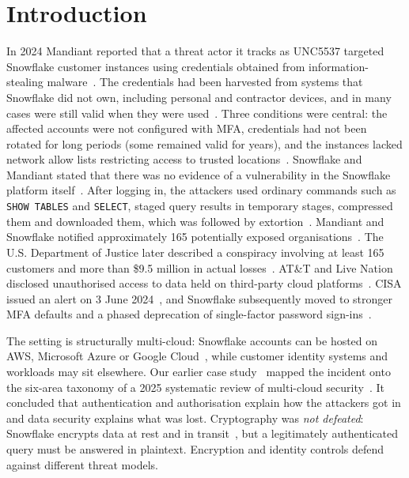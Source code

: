 \documentclass[conference]{IEEEtran}
\newcommand{\code}[1]{\texttt{\small #1}}
\begin{document}
\section{Introduction}
In 2024 Mandiant reported that a threat actor it tracks as UNC5537 targeted Snowflake customer instances using credentials obtained from information-stealing malware~\cite{mandiant2024unc5537}. The credentials had been harvested from systems that Snowflake did not own, including personal and contractor devices, and in many cases were still valid when they were used~\cite{casestudy2026}. Three conditions were central: the affected accounts were not configured with MFA, credentials had not been rotated for long periods (some remained valid for years), and the instances lacked network allow lists restricting access to trusted locations~\cite{mandiant2024unc5537}. Snowflake and Mandiant stated that there was no evidence of a vulnerability in the Snowflake platform itself~\cite{mandiant2024unc5537,snowflake-advisory2024}. After logging in, the attackers used ordinary commands such as \code{SHOW TABLES} and \code{SELECT}, staged query results in temporary stages, compressed them and downloaded them, which was followed by extortion~\cite{mandiant2024unc5537,casestudy2026}. Mandiant and Snowflake notified approximately 165 potentially exposed organisations~\cite{mandiant2024unc5537}. The U.S. Department of Justice later described a conspiracy involving at least 165 customers and more than \$9.5 million in actual losses~\cite{doj2026}. AT\&T and Live Nation disclosed unauthorised access to data held on third-party cloud platforms~\cite{att8k2024,livenation8k2024}. CISA issued an alert on 3 June 2024~\cite{cisa2024}, and Snowflake subsequently moved to stronger MFA defaults and a phased deprecation of single-factor password sign-ins~\cite{snowflake-mfa-rollout,kapko2024}.

The setting is structurally multi-cloud: Snowflake accounts can be hosted on AWS, Microsoft Azure or Google Cloud~\cite{snowflake-platforms}, while customer identity systems and workloads may sit elsewhere. Our earlier case study~\cite{casestudy2026} mapped the incident onto the six-area taxonomy of a 2025 systematic review of multi-cloud security~\cite{diningrat2025}. It concluded that authentication and authorisation explain how the attackers got in and data security explains what was lost. Cryptography was \emph{not defeated}: Snowflake encrypts data at rest and in transit~\cite{snowflake-e2e}, but a legitimately authenticated query must be answered in plaintext. Encryption and identity controls defend against different threat models.
\end{document}
